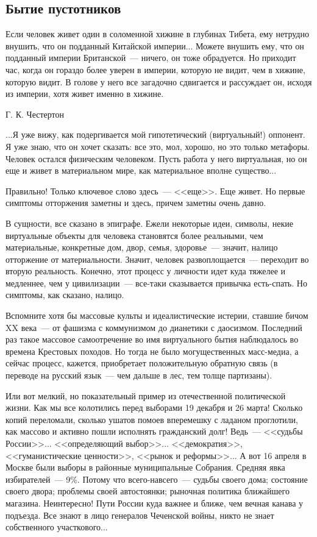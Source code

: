 \documentclass{scrbook}
\makeatletter
\newcommand{\bigepigraphwidth}{0.8} %
\newcommand{\defaultepigraphwidth}{0.5} %
\newcommand{\flqq}{<<}
\newcommand{\frqq}{>>}
\newcommand{\mdash}{~--- }
\newcommand{\essaysection}[1]{\subsection*{#1}\nopagebreak}
\newcommand{\myepigraph}[3][\@empty]{
	\ifx\@empty#1
		\setlength{\epigraphwidth}{\defaultepigraphwidth\textwidth}
	\else
		\setlength{\epigraphwidth}{#1\textwidth}
	\fi
	\epigraph{#2}{#3}
	\setlength{\epigraphwidth}{\defaultepigraphwidth\textwidth} %
	\nopagebreak
}
\makeatother
\begin{document}
\essaysection{Бытие пустотников}

\myepigraph[\bigepigraphwidth]{Если человек живет один в соломенной хижине в глубинах Тибета, ему нетрудно внушить, что он подданный Китайской империи... Можете внушить ему, что он подданный империи Британской{\mdash}ничего, он тоже обрадуется. Но приходит час, когда он гораздо более уверен в империи, которую не видит, чем в хижине, которую видит. В голове у него все загадочно сдвигается и рассуждает он, исходя из империи, хотя живет именно в хижине.}
{Г. К. Честертон}

...Я уже вижу, как подергивается мой гипотетический (виртуальный!) оппонент. Я уже знаю, что он хочет сказать: все это, мол, хорошо, но это только метафоры. Человек остался физическим человеком. Пусть работа у него виртуальная, но он еще и живет в материальном мире, как материальное вполне существо...

Правильно! Только ключевое слово здесь{\mdash}{\flqq}еще{\frqq}. Еще живет. Но первые симптомы отторжения заметны и здесь, причем заметны очень давно.

В сущности, все сказано в эпиграфе. Ежели некоторые идеи, символы, некие виртуальные объекты для человека становятся более реальными, чем материальные, конкретные дом, двор, семья, здоровье{\mdash}значит, налицо отторжение от материальности. Значит, человек развоплощается{\mdash}переходит во вторую реальность. Конечно, этот процесс у личности идет куда тяжелее и медленнее, чем у цивилизации{\mdash}все-таки сказывается привычка есть-спать. Но симптомы, как сказано, налицо.

Вспомните хотя бы массовые культы и идеалистические истерии, ставшие бичом XX века{\mdash}от фашизма с коммунизмом до дианетики с даосизмом. Последний раз такое массовое самоотречение во имя виртуального бытия наблюдалось во времена Крестовых походов. Но тогда не было могущественных масс-медиа, а сейчас процесс, кажется, приобретает положительную обратную связь (в переводе на русский язык{\mdash}чем дальше в лес, тем толще партизаны).

Или вот мелкий, но показательный пример из отечественной политической жизни. Как мы все колотились перед выборами 19 декабря и 26 марта! Сколько копий переломали, сколько ушатов помоев вперемешку с ладаном проглотили, как массово и активно пошли исполнять гражданский долг! Ведь{\mdash}{\flqq}судьбы России{\frqq}... {\flqq}определяющий выбор{\frqq}... {\flqq}демократия{\frqq}, {\flqq}гуманистические ценности{\frqq}, {\flqq}рынок и реформы{\frqq}... А вот 16 апреля в Москве были выборы в районные муниципальные Собрания. Средняя явка избирателей{\mdash}9\%. Потому что всего-навсего{\mdash}судьбы своего дома; состояние своего двора; проблемы своей автостоянки; рыночная политика ближайшего магазина. Неинтересно! Пути России куда важнее и ближе, чем вечная канава у подъезда. Все знают в лицо генералов Чеченской войны, никто не знает собственного участкового...
\end{document}
